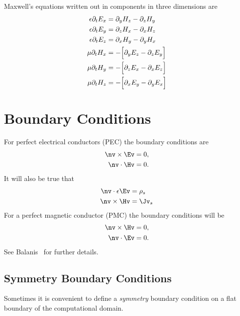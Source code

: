 \documentclass[10pt]{article}
\begin{document}
Maxwell's equations written out in components in three dimensions are 
\begin{align}
\epsilon \partial_t E_x &=  \partial_y H_z - \partial_z H_y \label{eq:Mx3dEx} \\
\epsilon \partial_t E_y &=  \partial_z H_x - \partial_x H_z \label{eq:Mx3dEy} \\
\epsilon \partial_t E_z &=  \partial_x H_y - \partial_y H_x \label{eq:Mx3dEz} \\
\mu  \partial_t H_x &=  -\Big[ \partial_y E_z - \partial_z E_y \Big] \label{eq:Mx3dHx}\\
\mu  \partial_t H_y &=  -\Big[ \partial_z E_x - \partial_x E_z \Big] \label{eq:Mx3dHy}\\
\mu  \partial_t H_z &=  -\Big[ \partial_x E_y - \partial_y E_x \Big] \label{eq:Mx3dHz}
\end{align}


\section{Boundary Conditions}

For perfect electrical conductors (PEC) the boundary conditions are
\begin{align}
  \nv\times\Ev & = 0, \label{eq:PEC} \\
   \nv\cdot\Hv &= 0 . 
\end{align}
It will also be true that
\begin{align*}
   \nv\cdot \eps\Ev &= \rho_s \\
   \nv\times\Hv &= \Jv_s
\end{align*}
% 
For a perfect magnetic conductor (PMC) the boundary conditions will be
\begin{align}
  \nv\times\Hv & = 0, \\
  \nv\cdot\Ev &= 0.
\end{align}
See Balanis~\cite{Balanis89} for further details. 

\subsection{Symmetry Boundary Conditions}

Sometimes it is convenient to define a {\em symmetry} boundary condition on a flat boundary of the computational domain.
\end{document}
